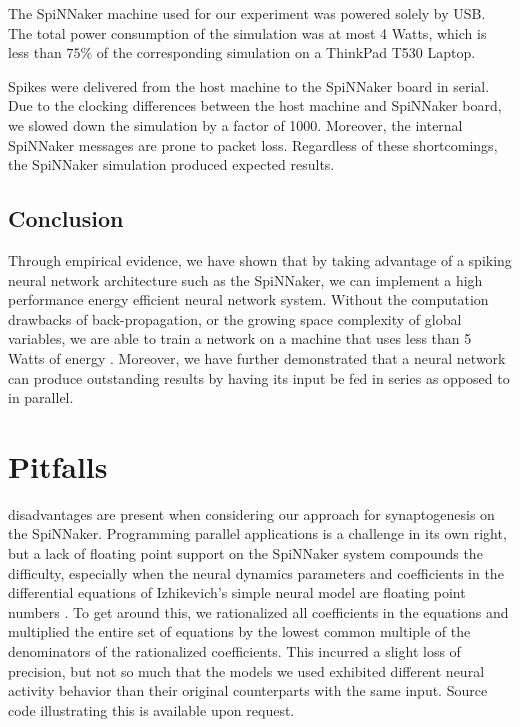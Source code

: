 \documentclass[journal]{./sty/IEEEtran}
\begin{document}
The SpiNNaker machine used for our experiment was powered solely by USB. 
The total power consumption of the simulation was at most 4 Watts, 
which is less than $75\%$ of the corresponding simulation on a ThinkPad T530 Laptop.

Spikes were delivered from the host machine to the SpiNNaker board in serial. 
Due to the clocking differences between the host machine and SpiNNaker board, 
we slowed down the simulation by a factor of 1000. 
Moreover, the internal SpiNNaker messages are prone to packet loss. 
Regardless of these shortcomings, the SpiNNaker simulation produced expected results.


\subsection{Conclusion}
Through empirical evidence, we have shown that by taking advantage of a spiking neural network architecture such as the SpiNNaker, 
we can implement a high performance energy efficient neural network system. 
Without the computation drawbacks of back-propagation, or the growing space complexity of global variables, 
we are able to train a network on a machine that uses less than 5 Watts of energy \cite{ArchOverV:Furber}.
Moreover, we have further demonstrated that a neural network can produce outstanding results by having its input be fed in series as opposed to in parallel.



\section{Pitfalls}
 disadvantages are present when considering our approach 
for synaptogenesis on the SpiNNaker. 
Programming parallel applications is a challenge in its own right, 
but a lack of floating point support on the 
SpiNNaker system \cite{ArchOverV:Furber} compounds the difficulty, 
especially when the neural dynamics parameters and coefficients in the differential equations 
of Izhikevich's simple neural model are floating point numbers \cite{Spikes:Izhi}. 
To get around this, we rationalized all coefficients in the equations and multiplied the 
entire set of equations by the lowest common multiple of the denominators of 
the rationalized coefficients. 
This incurred a slight loss of precision, but not so much that the models we 
used exhibited different neural activity behavior than their original counterparts 
with the same input. 
Source code illustrating this is available upon request.
\end{document}
